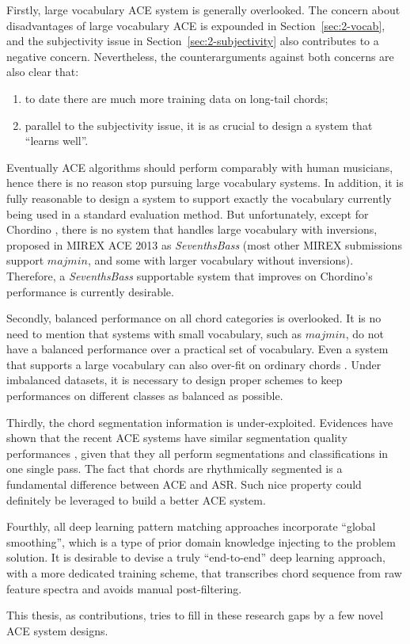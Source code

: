Firstly, large vocabulary ACE system is generally overlooked. The concern about disadvantages of large vocabulary ACE is expounded in Section~\ref{sec:2-vocab}, and the subjectivity issue in Section~\ref{sec:2-subjectivity} also contributes to a negative concern. Nevertheless, the counterarguments against both concerns are also clear that:
\begin{enumerate}
\item to date there are much more training data on long-tail chords;
\item parallel to the subjectivity issue, it is as crucial to design a system that ``learns well''.
\end{enumerate}
Eventually ACE algorithms should perform comparably with human musicians, hence there is no reason stop pursuing large vocabulary systems. In addition, it is fully reasonable to design a system to support exactly the vocabulary currently being used in a standard evaluation method. But unfortunately, except for Chordino \cite{cannam2010sonic}, there is no system that handles large vocabulary with inversions, proposed in MIREX ACE 2013 as \textit{SeventhsBass} (most other MIREX submissions support $majmin$, and some with larger vocabulary without inversions). Therefore, a \textit{SeventhsBass} supportable system that improves on Chordino's performance is currently desirable.

Secondly, balanced performance on all chord categories is overlooked. It is no need to mention that systems with small vocabulary, such as $majmin$, do not have a balanced performance over a practical set of vocabulary. Even a system that supports a large vocabulary can also over-fit on ordinary chords \cite{deng2016hybrid}. Under imbalanced datasets, it is necessary to design proper schemes to keep performances on different classes as balanced as possible.

Thirdly, the chord segmentation information is under-exploited. Evidences have shown that the recent ACE systems have similar segmentation quality performances \cite{burgoyne2014comparative}, given that they all perform segmentations and classifications in one single pass. The fact that chords are rhythmically segmented is a fundamental difference between ACE and ASR. Such nice property could definitely be leveraged to build a better ACE system.

Fourthly, all deep learning pattern matching approaches incorporate ``global smoothing'', which is a type of prior domain knowledge injecting to the problem solution. It is desirable to devise a truly ``end-to-end'' deep learning approach, with a more dedicated training scheme, that transcribes chord sequence from raw feature spectra and avoids manual post-filtering.

This thesis, as contributions, tries to fill in these research gaps by a few novel ACE system designs.

